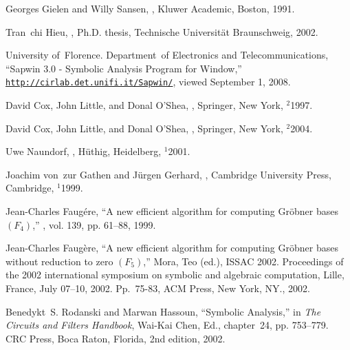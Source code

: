 \documentclass[10pt,twocolumn,pagenumbers]{IEEEtran}
\begin{document}

\begin{thebibliography}{10}

Georges Gielen and Willy Sansen,
,
\newblock Kluwer Academic, Boston, 1991.

Tran~chi Hieu,
,
\newblock Ph.D. thesis, Technische Universit\"at Braunschweig, 2002.

University of~Florence. Department~of Electronics and Telecommunications,
\newblock ``Sapwin 3.0 - {S}ymbolic {A}nalysis {P}rogram for {W}indow,''
  \href{http://cirlab.det.unifi.it/Sapwin/}{\tt http://cirlab.det.unifi.it/Sapwin/},
\newblock viewed September 1, 2008.

David Cox, John Little, and Donal O'Shea,
,
\newblock Springer, New York, $^2$1997.

David Cox, John Little, and Donal O'Shea,
,
\newblock Springer, New York, $^2$2004.

Uwe Naundorf,
,
\newblock H\"uthig, Heidelberg, $^1$2001.

Joachim von~zur {\uppercase{G}at}hen and J\"urgen Gerhard,
,
\newblock Cambridge University Press, Cambridge, $^1$1999.

Jean-Charles Faug\'ere,
\newblock ``A new efficient algorithm for computing {G}r\"obner bases
  $({F}_4)$,''
, vol. 139, pp. 61--88, 1999.

Jean-Charles Faug\`ere,
\newblock ``A new efficient algorithm for computing {G}r\"obner bases without
  reduction to zero $({F}_5)$,'' {Mora, Teo (ed.), ISSAC 2002. Proceedings of
  the 2002 international symposium on symbolic and algebraic computation,
  Lille, France, July 07--10, 2002. Pp.\ 75-83, ACM Press, New York, NY.},
  2002.

Benedykt~S. Rodanski and Marwan Hassoun,
\newblock ``Symbolic {A}nalysis,''
\newblock in {\em The Circuits and Filters Handbook}, Wai-Kai Chen, Ed.,
  chapter~24, pp. 753--779. CRC Press, Boca Raton, Florida, 2nd edition, 2002.


\end{thebibliography}
\end{document}
